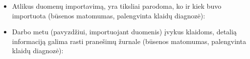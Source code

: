 \begin{itemize}
  \item Atlikus duomenų importavimą, yra tiksliai parodoma, ko ir kiek buvo importuota
  (būsenos matomumas, palengvinta klaidų diagnozė):

  \item Darbo metu (pavyzdžiui, importuojant duomenis) įvykus klaidoms, detalią informaciją
    galima rasti pranešimų žurnale (būsenos matomumas, palengvinta klaidų diagnozė):
\end{itemize}
